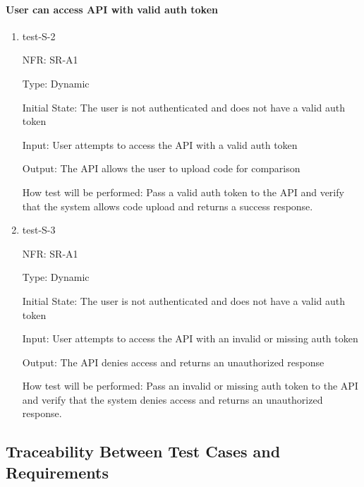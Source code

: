 \documentclass[12pt, titlepage]{article}
\begin{document}
\paragraph{User can access API with valid auth token}
\begin{enumerate}
  \item{test-S-2}

  NFR: SR-A1

  Type: Dynamic
            
  Initial State: The user is not authenticated and does not have a valid auth token
            
  Input: User attempts to access the API with a valid auth token
            
  Output: The API allows the user to upload code for comparison
            
  How test will be performed: 
  Pass a valid auth token to the API and verify that the system allows code upload and returns a success response.

  \item{test-S-3}

  NFR: SR-A1

  Type: Dynamic

  Initial State: The user is not authenticated and does not have a valid auth token

  Input: User attempts to access the API with an invalid or missing auth token

  Output: The API denies access and returns an unauthorized response

  How test will be performed:
  Pass an invalid or missing auth token to the API and verify that the system denies access and returns an unauthorized response.

\end{enumerate}

\subsection{Traceability Between Test Cases and Requirements}
\end{document}
